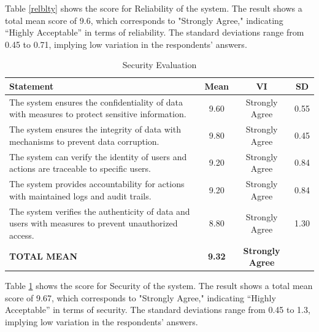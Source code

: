 	Table \ref{relblty} shows the score for Reliability of the system. The result shows a total mean score of 9.6, which corresponds to "Strongly Agree," indicating “Highly Acceptable” in terms of reliability. The standard deviations range from 0.45 to 0.71, implying low variation in the respondents’ answers.
	
	\begin{table}[h!]
		\centering
		\caption{Security Evaluation}
		\label{secrty}
		\renewcommand{\arraystretch}{1.2}
		\begin{tabularx}{\linewidth}{|X|c|c|c|}
			\hline
			\textbf{Statement} & \textbf{Mean} & \textbf{VI} & \textbf{SD} \\ \hline
			The system ensures the confidentiality of data with measures to protect sensitive information.
			& 9.60 & Strongly Agree & 0.55 \\ \hline
			The system ensures the integrity of data with mechanisms to prevent data corruption.
			& 9.80 & Strongly Agree & 0.45 \\ \hline
			The system can verify the identity of users and actions are traceable to specific users.
			& 9.20 & Strongly Agree & 0.84 \\ \hline
			The system provides accountability for actions with maintained logs and audit trails.
			& 9.20 & Strongly Agree & 0.84 \\ \hline
			The system verifies the authenticity of data and users with measures to prevent unauthorized access.
			& 8.80 & Strongly Agree & 1.30 \\ \hline
			\textbf{TOTAL MEAN} & \textbf{9.32} & \textbf{Strongly Agree} & \\ \hline
		\end{tabularx}
	\end{table}
	
	Table \ref{secrty} shows the score for Security of the system. The result shows a total mean score of 9.67, which corresponds to "Strongly Agree," indicating “Highly Acceptable” in terms of security. The standard deviations range from 0.45 to 1.3, implying low variation in the respondents’ answers.
	
